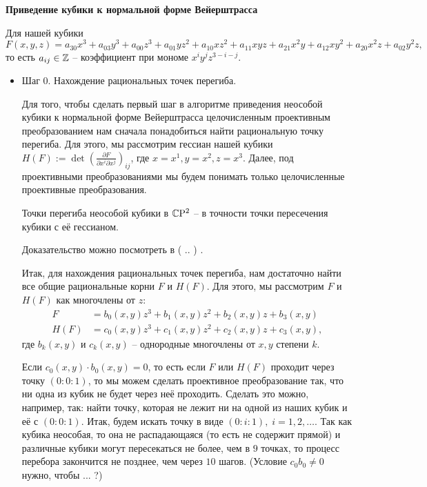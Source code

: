 \begin{center}
    {\normalfont\fontsize{13}{13}\textbf{Приведение кубики к нормальной форме Вейерштрасса}}
\end{center}

Для нашей кубики 
\[
F(x, y, z) = a_{30} x^3 + a_{03} y^3 + a_{00} z^3 + a_{01} y z^2 + a_{10} x z^2 +
a_{11} x y z + a_{21} x^2 y + a_{12} x y^2 + a_{20} x^2 z + a_{02} y^2 z
,\] 
то есть \(a_{ij} \in \mathbb{Z}\) -- коэффициент при мономе \(x^{i} y^{j} z^{3 - i -
j}\). 



\begin{itemize}[leftmargin=0.6cm]
    
    \item Шаг 0. Нахождение рациональных точек перегиба. 

    Для того, чтобы сделать первый шаг в алгоритме приведения неособой
    кубики к нормальной форме Вейерштрасса целочисленным проективным
    преобразованием нам сначала понадобиться найти рациональную точку
    перегиба. Для этого, мы рассмотрим гессиан нашей кубики \(H(F) := \det \left(
    \frac{\partial F}{\partial x^{i} \partial x^{j}}\right)_{ij}\), где \(x =
    x^{1}, y = x^{2}, z = x^{3}\). Далее, под проективными
    преобразованиями мы будем понимать только целочисленные проективные
    преобразования.

    \begin{theoremf}
        Точки перегиба неособой кубики в \(\mathbb{C} \mathrm{P}^2\) -- в точности
        точки пересечения кубики с её гессианом.
    \end{theoremf}

    Доказательство можно посмотреть в ( .. ) .

    Итак, для нахождения рациональных точек перегиба, нам достаточно найти
    все общие рациональные корни \(F\) и \(H(F)\). Для этого, мы
    рассмотрим \(F\) и \(H(F)\) как многочлены от \(z\):
    \begin{align*}
        F &= b_0(x, y) z^3 + b_1(x, y) z^2 + b_2(x, y) z + b_3(x, y) \\
        H(F) &= c_0(x, y) z^3 + c_1(x, y) z^2 + c_2(x, y) z + c_3(x, y) 
    ,\end{align*}
    где \(b_k(x, y)\) и \(c_k(x, y)\) -- однородные многочлены от \(x, y\) 
    степени \(k\). 

    Если \(c_0(x, y) \cdot b_0(x, y) = 0\), то есть если
    \(F\) или \(H(F)\) проходит через точку \((0 : 0 : 1)\), то мы можем
    сделать проективное преобразование так, что ни одна из кубик не будет
    через неё проходить. Сделать это можно, например, так: найти точку,
    которая не лежит ни на одной из наших кубик и  её
    с \((0 : 0 : 1)\). Итак, будем искать точку в виде \((0 : i : 1), \; i
    = 1, 2, \ldots\).
    Так как кубика неособая, то она не распадающаяся (то есть не содержит
    прямой) и различные кубики могут пересекаться не более, чем в \(9\) 
    точках, то процесс перебора закончится не позднее, чем через \(10\) 
    шагов. (Условие \(c_0 b_0 \ne 0\) нужно, чтобы ... ?)


\end{itemize}
